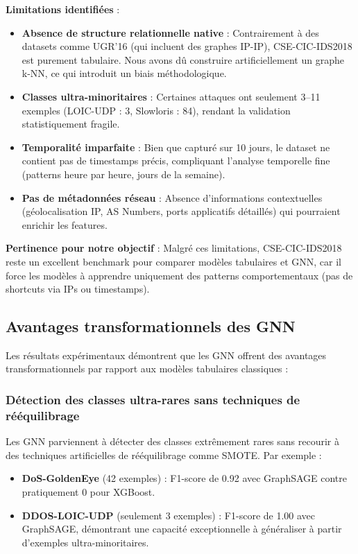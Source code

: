 ﻿\documentclass[11pt,a4paper]{article}
\begin{document}
\textbf{Limitations identifiées} :
\begin{itemize}
    \item \textbf{Absence de structure relationnelle native} : Contrairement à des datasets comme UGR'16 (qui incluent des graphes IP-IP), CSE-CIC-IDS2018 est purement tabulaire. Nous avons dû construire artificiellement un graphe k-NN, ce qui introduit un biais méthodologique.
    
    \item \textbf{Classes ultra-minoritaires} : Certaines attaques ont seulement 3--11 exemples (LOIC-UDP : 3, Slowloris : 84), rendant la validation statistiquement fragile.
    
    \item \textbf{Temporalité imparfaite} : Bien que capturé sur 10 jours, le dataset ne contient pas de timestamps précis, compliquant l'analyse temporelle fine (patterns heure par heure, jours de la semaine).
    
    \item \textbf{Pas de métadonnées réseau} : Absence d'informations contextuelles (géolocalisation IP, AS Numbers, ports applicatifs détaillés) qui pourraient enrichir les features.
\end{itemize}

\textbf{Pertinence pour notre objectif} : Malgré ces limitations, CSE-CIC-IDS2018 reste un excellent benchmark pour comparer modèles tabulaires et GNN, car il force les modèles à apprendre uniquement des patterns comportementaux (pas de shortcuts via IPs ou timestamps).

\subsection{Avantages transformationnels des GNN}

Les résultats expérimentaux démontrent que les GNN offrent des avantages transformationnels par rapport aux modèles tabulaires classiques :

\subsubsection{Détection des classes ultra-rares sans techniques de rééquilibrage}

Les GNN parviennent à détecter des classes extrêmement rares sans recourir à des techniques artificielles de rééquilibrage comme SMOTE. Par exemple :
\begin{itemize}
    \item \textbf{DoS-GoldenEye} (42 exemples) : F1-score de 0.92 avec GraphSAGE contre pratiquement 0 pour XGBoost.
    \item \textbf{DDOS-LOIC-UDP} (seulement 3 exemples) : F1-score de 1.00 avec GraphSAGE, démontrant une capacité exceptionnelle à généraliser à partir d'exemples ultra-minoritaires.
\end{itemize}
\end{document}
